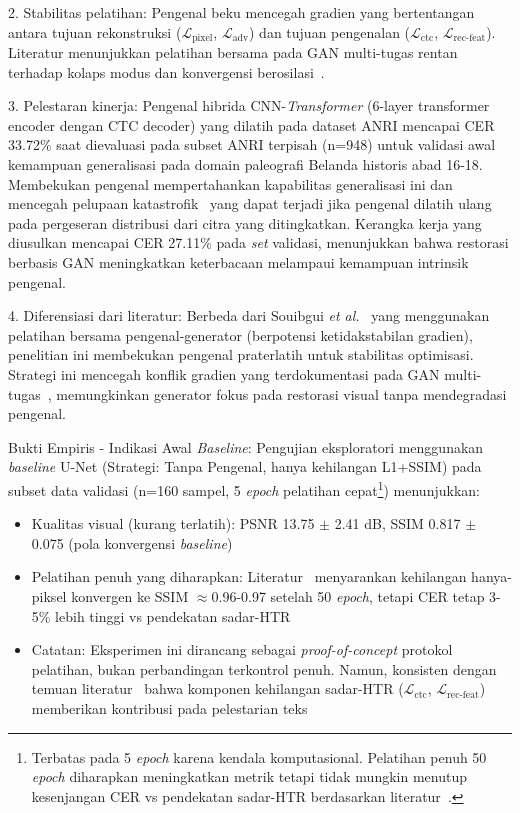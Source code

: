 \documentclass[journal]{IEEEtran}
\begin{document}
2. Stabilitas pelatihan: Pengenal beku mencegah gradien yang bertentangan antara tujuan rekonstruksi ($\mathcal{L}_{\text{pixel}}$, $\mathcal{L}_{\text{adv}}$) dan tujuan pengenalan ($\mathcal{L}_{\text{ctc}}$, $\mathcal{L}_{\text{rec-feat}}$). Literatur menunjukkan pelatihan bersama pada GAN multi-tugas rentan terhadap kolaps modus dan konvergensi berosilasi~\cite{souibgui2022,kang2021pay}.

3. Pelestaran kinerja: Pengenal hibrida CNN-\textit{Transformer} (6-layer transformer encoder dengan CTC decoder) yang dilatih pada dataset ANRI mencapai CER 33.72\% saat dievaluasi pada subset ANRI terpisah (n=948) untuk validasi awal kemampuan generalisasi pada domain paleografi Belanda historis abad 16-18. Membekukan pengenal mempertahankan kapabilitas generalisasi ini dan mencegah pelupaan katastrofik~\cite{kirkpatrick2017overcoming} yang dapat terjadi jika pengenal dilatih ulang pada pergeseran distribusi dari citra yang ditingkatkan. Kerangka kerja yang diusulkan mencapai CER 27.11\% pada \textit{set} validasi, menunjukkan bahwa restorasi berbasis GAN meningkatkan keterbacaan melampaui kemampuan intrinsik pengenal.

4. Diferensiasi dari literatur: Berbeda dari Souibgui \textit{et al.}~\cite{souibgui2022} yang menggunakan pelatihan bersama pengenal-generator (berpotensi ketidakstabilan gradien), penelitian ini membekukan pengenal praterlatih untuk stabilitas optimisasi. Strategi ini mencegah konflik gradien yang terdokumentasi pada GAN multi-tugas~\cite{souibgui2022,kang2021pay}, memungkinkan generator fokus pada restorasi visual tanpa mendegradasi pengenal.

Bukti Empiris - Indikasi Awal \textit{Baseline}: Pengujian eksploratori menggunakan \textit{baseline} U-Net (Strategi: Tanpa Pengenal, hanya kehilangan L1+SSIM) pada subset data validasi (n=160 sampel, 5 \textit{epoch} pelatihan cepat\footnote{Terbatas pada 5 \textit{epoch} karena kendala komputasional. Pelatihan penuh 50 \textit{epoch} diharapkan meningkatkan metrik tetapi tidak mungkin menutup kesenjangan CER vs pendekatan sadar-HTR berdasarkan literatur~\cite{souibgui2022,kang2021pay}.}) menunjukkan:
\begin{itemize}
    \item Kualitas visual (kurang terlatih): PSNR 13.75 $\pm$ 2.41 dB, SSIM 0.817 $\pm$ 0.075 (pola konvergensi \textit{baseline})
    \item Pelatihan penuh yang diharapkan: Literatur~\cite{souibgui2022} menyarankan kehilangan hanya-piksel konvergen ke SSIM $\approx$0.96-0.97 setelah 50 \textit{epoch}, tetapi CER tetap 3-5\% lebih tinggi vs pendekatan sadar-HTR
    \item Catatan: Eksperimen ini dirancang sebagai \textit{proof-of-concept} protokol pelatihan, bukan perbandingan terkontrol penuh. Namun, konsisten dengan temuan literatur~\cite{souibgui2022,kang2021pay} bahwa komponen kehilangan sadar-HTR ($\mathcal{L}_{\text{ctc}}$, $\mathcal{L}_{\text{rec-feat}}$) memberikan kontribusi pada pelestarian teks
\end{itemize}
\end{document}
